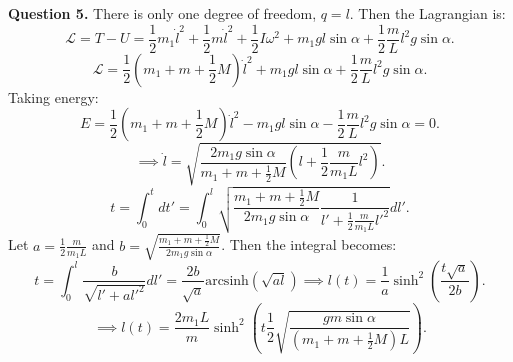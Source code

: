 \documentclass[letterpaper, reqno,11pt]{article}
\begin{document}
{\noindent\bf Question 5.} There is only one degree of freedom, $q=l$. Then the Lagrangian is: 
\[
\mathcal L=T-U=\frac{1}{2}m_1\dot l^2+\frac{1}{2}m\dot l^2+\frac{1}{2}I\omega^2+m_1gl\sin\alpha+\frac{1}{2}\frac{m}{L}l^2g\sin\alpha
.\]
\[
\mathcal L=\frac{1}{2}\left( m_1+m+\frac{1}{2}M \right)\dot l^2+m_1gl\sin\alpha+\frac{1}{2}\frac{m}{L}l^2g\sin\alpha
.\]
Taking energy: 
\[
E=\frac{1}{2}\left( m_1+m+\frac{1}{2}M \right)\dot l^2-m_1gl\sin\alpha-\frac{1}{2}\frac{m}{L}l^2g\sin\alpha=0
.\]
\[
\implies \dot l=\sqrt{\frac{2m_1 g\sin\alpha}{m_1+m+\frac{1}{2}M}\left( l+\frac{1}{2}\frac{m}{m_1L}l^2 \right) } 
.\]
\[
t=\int_0^t dt'=\int_0^l \sqrt{\frac{m_1+m+\frac{1}{2}M}{2m_1 g\sin\alpha}\frac1{l'+\frac{1}{2}\frac{m}{m_1L}l'^2} }dl'
.\]
Let $a=\frac{1}{2}\frac{m}{m_1L}$ and $b=\sqrt{\frac{m_1+m+\frac{1}{2}M}{2m_1g\sin\alpha}} $. Then the integral becomes: 
\[
t=\int_0^l \frac{b}{\sqrt{l'+al'^2} }dl'=\frac{2b}{\sqrt{a} }\text{arcsinh}\left( \sqrt{al}  \right) \implies l(t)=\frac{1}{a}\sinh^2\left( \frac{t\sqrt{a}}{2b} \right) 
.\]
\[
\implies l(t)=\frac{2m_1L}{m}\sinh^2\left( t \frac{1}{2}\sqrt{\frac{gm\sin\alpha}{(m_1+m+\frac{1}{2}M)L}}  \right) 
.\]
\end{document}
